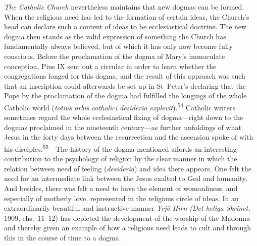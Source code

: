 \documentclass[12pt,a4paper]{book}
\newcommand{\opage}[1]{\marginnote{\footnotesize\textit{[#1]}}}
\begin{document}
\emph{The Catholic Church} nevertheless maintains that new dogmas can be formed. When the religious
need has led to the formation of certain ideas, the Church's head can declare such a content of
ideas to be ecclesiastical doctrine. The new dogma then stands as the valid expression of something
the Church has fundamentally always believed, but of which it has only now become fully conscious.
Before the proclamation of the dogma of Mary's immaculate conception, Pius IX sent out a circular in
order to learn whether the congregations longed for this dogma, and the result of this approach was
such that an inscription could afterwards be set up in St~Peter's declaring that the Pope by the
proclamation of the dogma had fulfilled the longings of the whole Catholic world (\textit{totius
orbis catholici desideria explevit}).\textsuperscript{54} Catholic writers sometimes regard the whole
ecclesiastical fixing of dogma---right down to the dogmas proclaimed in the nineteenth century---as
further unfoldings of what Jesus in the forty days between the resurrection and the ascension spoke
of with his disciples.\textsuperscript{55}---The history of the dogma mentioned affords an
interesting contribution to the psychology of religion by the clear manner in which the relation
between need of feeling (\textit{desideria}) and idea there appears. One felt the need for an
intermediate link between the Jesus exalted to God and humanity. And besides, there was felt a need
to have the element of womanliness, and especially of motherly love, represented in the religious
circle of ideas. In an extraordinarily beautiful and instructive manner \emph{Yrjö Hirn (Det heliga
Skrinet,} 1909, 
\opage{115}chs.~11--12) has depicted the development of the worship of the Madonna and thereby
given an example of how a religious need leads to cult and through this in the course of time to a
dogma.
\end{document}
